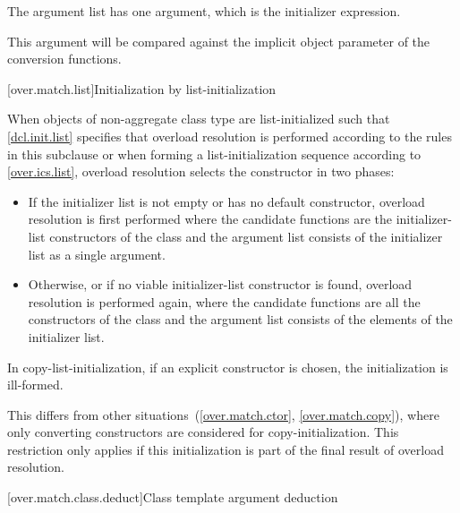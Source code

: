 \pnum
The argument list has one argument, which is the initializer expression.
\begin{note}
This argument will be compared against
the implicit object parameter of the conversion functions.
\end{note}

[over.match.list]{Initialization by list-initialization}%

\pnum
When objects of non-aggregate class type  are
list-initialized such that \ref{dcl.init.list} specifies that overload resolution
is performed according to the rules in this subclause
or when forming a list-initialization sequence according to \ref{over.ics.list},
overload resolution selects the constructor in two phases:

\begin{itemize}
\item
If the initializer list is not empty or  has no default constructor,
overload resolution is first performed
where the candidate functions are the initializer-list constructors
of the class  and
the argument list consists of the initializer list as a single argument.

\item
Otherwise, or if no viable initializer-list constructor is found,
overload resolution is
performed again, where the candidate functions are all the constructors of
the class  and
the argument list consists of the elements of the initializer list.
\end{itemize}

In copy-list-initialization, if an explicit constructor is
chosen, the initialization is ill-formed.
\begin{note}
This differs from other situations~(\ref{over.match.ctor}, \ref{over.match.copy}),
where only converting constructors are considered for copy-initialization.
This restriction only
applies if this initialization is part of the final result of overload
resolution.
\end{note}

[over.match.class.deduct]{Class template argument deduction}%
%

